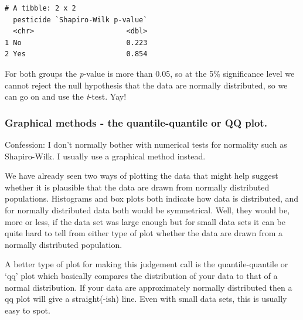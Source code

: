 \documentclass[
  letterpaper,
  DIV=11,
  numbers=noendperiod]{scrreprt}
\newenvironment{Shaded}{\begin{snugshade}}{\end{snugshade}}
\newcommand{\FunctionTok}[1]{\textcolor[rgb]{0.28,0.35,0.67}{#1}}
\newcommand{\NormalTok}[1]{\textcolor[rgb]{0.00,0.23,0.31}{#1}}
\newcommand{\OtherTok}[1]{\textcolor[rgb]{0.00,0.23,0.31}{#1}}
\newcommand{\SpecialCharTok}[1]{\textcolor[rgb]{0.37,0.37,0.37}{#1}}
\newcommand{\StringTok}[1]{\textcolor[rgb]{0.13,0.47,0.30}{#1}}
\begin{document}
\begin{Shaded}
\end{Shaded}

\begin{verbatim}
# A tibble: 2 x 2
  pesticide `Shapiro-Wilk p-value`
  <chr>                      <dbl>
1 No                         0.223
2 Yes                        0.854
\end{verbatim}

For both groups the \emph{p}-value is more than 0.05, so at the 5\%
significance level we cannot reject the null hypothesis that the data
are normally distributed, so we can go on and use the \emph{t}-test.
Yay!

\subsubsection{Graphical methods - the quantile-quantile or QQ
plot.}\label{graphical-methods---the-quantile-quantile-or-qq-plot.}

Confession: I don't normally bother with numerical tests for normality
such as Shapiro-Wilk. I usually use a graphical method instead.

We have already seen two ways of plotting the data that might help
suggest whether it is plausible that the data are drawn from normally
distributed populations. Histograms and box plots both indicate how data
is distributed, and for normally distributed data both would be
symmetrical. Well, they would be, more or less, if the data set was
large enough but for small data sets it can be quite hard to tell from
either type of plot whether the data are drawn from a normally
distributed population.

A better type of plot for making this judgement call is the
quantile-quantile or `qq' plot which basically compares the distribution
of your data to that of a normal distribution. If your data are
approximately normally distributed then a qq plot will give a
straight(-ish) line. Even with small data sets, this is usually easy to
spot.
\end{document}
